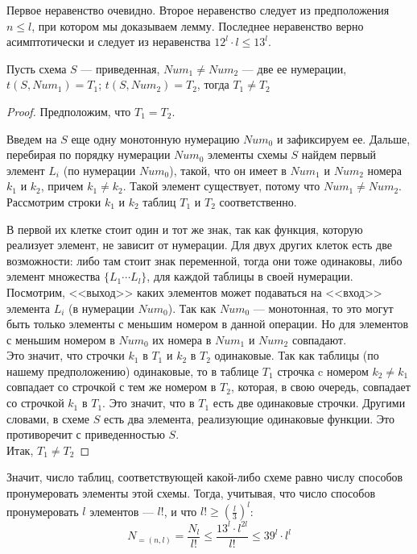 Первое неравенство очевидно. Второе неравенство следует из предположения $n\leq l$, при котором мы доказываем лемму. Последнее неравенство верно асимптотически и следует из неравенства $12^l\cdot l\leq 13^l$.
\begin{statement}
Пусть схема $S$ --- приведенная, $Num_1 \neq Num_2$ --- две ее нумерации, $t(S, Num_1)= T_1$;  $t(S, Num_2)= T_2$, тогда $T_1 \neq T_2$
\end{statement}
\begin{proof}
Предположим, что $T_1 = T_2$.

Введем на $S$ еще одну монотонную нумерацию $Num_0$ и зафиксируем ее. Дальше, перебирая по порядку нумерации $Num_0$ элементы схемы $S$ найдем первый элемент $L_i$ (по нумерации $Num_0$), такой, что он имеет в $Num_1$ и $Num_2$ номера $k_1$ и $k_2$, причем $k_1 \neq k_2$. Такой элемент существует, потому что $Num_1 \neq Num_2$. Рассмотрим строки $k_1$ и $k_2$ таблиц $T_1$ и $T_2$ соответственно. 

В первой их клетке стоит один и тот же знак, так как функция, которую реализует элемент, не зависит от нумерации. Для двух других клеток есть две возможности: либо там стоит знак переменной, тогда они тоже одинаковы, либо элемент множества $\{ L_1 \cdots L_l\} $, для каждой таблицы в своей нумерации. \\
Посмотрим, <<выход>> каких элементов может подаваться на <<вход>> элемента $L_i$ (в нумерации $Num_0$). Так как $Num_0$ --- монотонная, то  это могут быть только элементы с меньшим номером в данной операции.  Но для элементов с меньшим номером в $Num_0$ их номера в $Num_1$ и $Num_2$ совпадают. \\
Это значит, что строчки $k_1$ в $T_1$ и $k_2$ в $T_2$ одинаковые. Так как таблицы (по нашему предположению) одинаковые, то в таблице $T_1$ строчка c номером $k_2 \neq k_1$ совпадает со строчкой с тем же номером в $T_2$, которая, в свою очередь, совпадает со строчкой $k_1$ в $T_1$. Это значит, что в $T_1$ есть две одинаковые строчки. Другими словами, в схеме $S$ есть два элемента, реализующие одинаковые функции. Это противоречит с приведенностью $S$.\\
Итак, $T_1 \neq T_2$
\end{proof}
Значит, число таблиц, соответствующей какой-либо схеме равно числу способов пронумеровать элементы этой схемы.
Тогда, учитывая, что число способов пронумеровать $l$ элементов --- $l!$, и что $l! \geq (\frac{l}{3})^l $:\\
$$ N_{=(n,l)}=\frac{N_l}{l!} \leq \frac{13^l\cdot l^{2l}}{l!} \leq 39^l\cdot l^l $$\\
